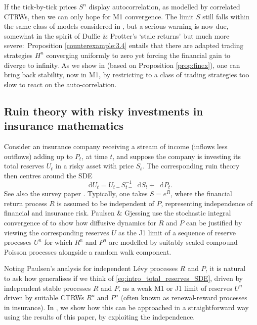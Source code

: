 \documentclass[11pt]{article}
\theoremstyle{definition}\newtheorem{example}[theorem]{Example}
\theoremstyle{definition}\newtheorem{counterexample}[theorem]{Counterexample}
\theoremstyle{definition}\newtheorem{remark}[theorem]{Remark}
\theoremstyle{definition}\newtheorem{defi}[theorem]{Definition}
\numberwithin{equation}{section}
\newcommand*\diff{\mathop{}\!\mathrm{d}}								%
\renewcommand{\|}{\; : \, \;}											%
\begin{document}
If the tick-by-tick prices $S^n$ display autocorrelation, as modelled by  correlated CTRWs, then we can only hope for M1 convergence. The limit $S$ still falls within the same class of models considered in \cite{jack}, but a serious warning is now due, somewhat in the spirit of Duffie \& Protter's `stale returns' but much more severe:~Proposition \ref{counterexample:3.4} entails that there are adapted trading strategies $H^n$ converging uniformly to zero yet forcing the financial gain to diverge to infinity. As we show in \cite{andreasfabrice_applications} (based on Proposition \ref{prop:finex}), one can bring back stability, now in M1, by restricting to a class of trading strategies too slow to react on the auto-correlation.






\subsection{Ruin theory with risky investments in insurance mathematics}
\label{subsect:intro_insurance}
Consider an insurance company receiving a stream of income (inflows less outflows) adding up to $P_t$, at time $t$, and suppose the company is investing its total reserves $U_t$ in a risky asset with price $S_t$. The corresponding ruin theory \cite{Gjerssing_Paulsen_SPA,Kalashnikov_Norberg,Norberg_Steffensen,Paulsen_AAP,Paulsen_SPA,Paulsen_Gjessing_Advances} then centres around the SDE
\begin{equation}\label{eq:intro_total_reserves_SDE}
	\diff U_t = U_{t-}S^{-1}_{t-} \diff S_t+ \diff P_t.
\end{equation}
See also the survey paper \cite{ Paulsen_ProbSurveys}. Typically, one takes $S=e^R$, where the financial return process $R$ is assumed to be independent of $P$, representing independence of financial and insurance risk. Paulsen \& Gjessing \cite{Paulsen_Gjessing_Advances} use the stochastic integral convergence of  \cite[Thm.~2.5]{kurtzprotter} to show how diffusive dynamics for $R$ and $P$ can be justified by viewing the corresponding reserves $U$ as the J1 limit of a sequence of reserve processes $U^n$ for which $R^n$ and $P^n$ are modelled by suitably scaled compound Poisson processes alongside a random walk component.

Noting Paulsen's analysis \cite{Paulsen_AAP} for  independent L\'evy processes $R$ and $P$, it is natural to ask how \cite{Paulsen_Gjessing_Advances} generalises if we think of \eqref{eq:intro_total_reserves_SDE}, driven by independent stable processes $R$ and $P$, as a weak M1 or J1 limit of reserves $U^n$ driven by suitable CTRWs $R^n$ and $P^n$ (often known as renewal-reward processes in insurance). In \cite{andreasfabrice_applications}, we show how this can be approached in a straightforward way using the results of this paper, by exploiting the independence.
\end{document}
